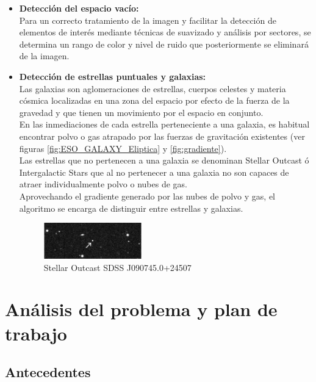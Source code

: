 \begin{itemize}
		\item \textbf{Detección del espacio vacío:}\\
		Para un correcto tratamiento de la imagen y facilitar la detección de elementos de interés mediante técnicas de suavizado y análisis por sectores, se determina un rango de color y nivel de ruido que posteriormente se eliminará de la imagen.
		
		\item \textbf{Detección de estrellas puntuales y galaxias:}\\
		Las galaxias son aglomeraciones de estrellas, cuerpos celestes y materia cósmica localizadas en una zona del espacio por efecto de la fuerza de la gravedad y que tienen un movimiento por el espacio en conjunto.\\
		En las inmediaciones de cada estrella perteneciente a una galaxia, es habitual encontrar polvo o gas atrapado por las fuerzas de gravitación existentes (ver figuras \ref{fig:ESO_GALAXY_Eliptica} y \ref{fig:gradiente}).\\

		Las estrellas que no pertenecen a una galaxia se denominan Stellar Outcast\cite{stellarOutcast} ó Intergalactic Stars que al no pertenecer a una galaxia no son capaces de atraer individualmente polvo o nubes de gas.\\
		Aprovechando el gradiente generado por las nubes de polvo y gas, el	algoritmo se encarga de distinguir entre estrellas y galaxias.
		\begin{figure}[!htb]%
			\centering
			\includegraphics[width=0.4\textwidth]{images/star.jpg}
			\caption{\label{fig:IntergalacticStar}{\small Stellar Outcast SDSS J090745.0+24507}}
		\end{figure}

	\end{itemize}	

	\vfill

	\section{Análisis del problema y plan de trabajo}

	\subsection{Antecedentes }
	
